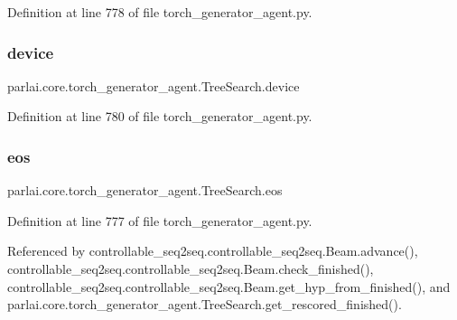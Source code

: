 Definition at line 778 of file torch\+\_\+generator\+\_\+agent.\+py.

\mbox{\label{classparlai_1_1core_1_1torch__generator__agent_1_1TreeSearch_a37b3f7f827909e3aa2d8e35c32c41e81}} 
\subsubsection{\texorpdfstring{device}{device}}
{\footnotesize\ttfamily parlai.\+core.\+torch\+\_\+generator\+\_\+agent.\+Tree\+Search.\+device}



Definition at line 780 of file torch\+\_\+generator\+\_\+agent.\+py.

\mbox{\label{classparlai_1_1core_1_1torch__generator__agent_1_1TreeSearch_a51a1164086e9033c942b3c7ab3d6a194}} 
\subsubsection{\texorpdfstring{eos}{eos}}
{\footnotesize\ttfamily parlai.\+core.\+torch\+\_\+generator\+\_\+agent.\+Tree\+Search.\+eos}



Definition at line 777 of file torch\+\_\+generator\+\_\+agent.\+py.



Referenced by controllable\+\_\+seq2seq.\+controllable\+\_\+seq2seq.\+Beam.\+advance(), controllable\+\_\+seq2seq.\+controllable\+\_\+seq2seq.\+Beam.\+check\+\_\+finished(), controllable\+\_\+seq2seq.\+controllable\+\_\+seq2seq.\+Beam.\+get\+\_\+hyp\+\_\+from\+\_\+finished(), and parlai.\+core.\+torch\+\_\+generator\+\_\+agent.\+Tree\+Search.\+get\+\_\+rescored\+\_\+finished().

